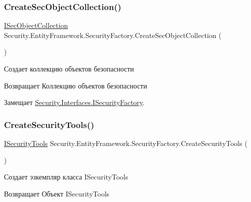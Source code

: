\subsubsection{\texorpdfstring{Create\+Sec\+Object\+Collection()}{CreateSecObjectCollection()}}
{\footnotesize\ttfamily \hyperlink{interface_security_1_1_interfaces_1_1_collections_1_1_i_sec_object_collection}{I\+Sec\+Object\+Collection} Security.\+Entity\+Framework.\+Security\+Factory.\+Create\+Sec\+Object\+Collection (\begin{DoxyParamCaption}{ }\end{DoxyParamCaption})}



Создает коллекцию объектов безопасности 

\begin{DoxyReturn}{Возвращает}
Коллекцию объектов безопасности
\end{DoxyReturn}


Замещает \hyperlink{interface_security_1_1_interfaces_1_1_i_security_factory_aa03c6ad65ac4dcf14f35f8ed659cf930}{Security.\+Interfaces.\+I\+Security\+Factory}.

\mbox{\label{class_security_1_1_entity_framework_1_1_security_factory_a7d14f76fcb34ef137f2d4f425585d5ee}} 
\subsubsection{\texorpdfstring{Create\+Security\+Tools()}{CreateSecurityTools()}}
{\footnotesize\ttfamily \hyperlink{interface_security_1_1_interfaces_1_1_i_security_tools}{I\+Security\+Tools} Security.\+Entity\+Framework.\+Security\+Factory.\+Create\+Security\+Tools (\begin{DoxyParamCaption}{ }\end{DoxyParamCaption})}



Создает эзкемпляр класса I\+Security\+Tools 

\begin{DoxyReturn}{Возвращает}
Объект I\+Security\+Tools
\end{DoxyReturn}


